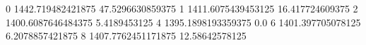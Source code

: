 0 1442.719482421875 47.5296630859375
1 1411.6075439453125 16.417724609375
2 1400.6087646484375 5.4189453125
4 1395.1898193359375 0.0
6 1401.397705078125 6.2078857421875
8 1407.7762451171875 12.58642578125

